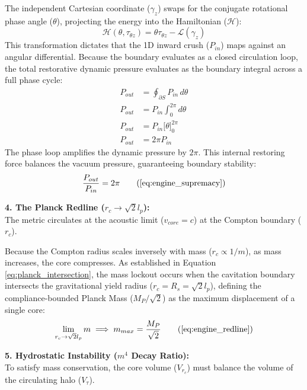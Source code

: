 The independent Cartesian coordinate ($\gamma_z$) swaps for the conjugate rotational phase angle ($\theta$), projecting the energy into the Hamiltonian ($\mathcal{H}$):
\begin{equation}
    \mathcal{H}(\theta, \tau_{\theta z}) = \theta \tau_{\theta z} - \mathcal{L}(\gamma_z) \label{eq:power_legendre}
\end{equation}
This transformation dictates that the 1D inward crush ($P_{in}$) maps against an angular differential. Because the boundary evaluates as a closed circulation loop, the total restorative dynamic pressure evaluates as the boundary integral across a full phase cycle: 
\begin{align}
    P_{out} &= \oint_{\partial S} P_{in} \, d\theta  \nonumber \\
    P_{out} &= P_{in} \int_{0}^{2\pi} d\theta \nonumber \\
    P_{out} &= P_{in} \Big[ \theta \Big]_{0}^{2\pi} \nonumber \\
    P_{out} &= 2\pi P_{in} \nonumber
\end{align}
The phase loop amplifies the dynamic pressure by $2\pi$. This internal restoring force balances the vacuum pressure, guaranteeing boundary stability:
\begin{equation}
    \frac{P_{out}}{P_{in}} = 2\pi \tag{\ref{eq:engine_supremacy}}
\end{equation}

\textbf{4. The Planck Redline ($r_c \to \sqrt{2} l_p$):} \\ %
The metric circulates at the acoustic limit ($v_{core} = c$) at the Compton boundary ($r_c$).

Because the Compton radius scales inversely with mass ($r_c \propto 1/m$), as mass increases, the core compresses. As established in Equation \ref{eq:planck_intersection}, the mass lockout occurs when the cavitation boundary intersects the gravitational yield radius ($r_c = R_s = \sqrt{2} l_p$), defining the compliance-bounded Planck Mass ($M_P / \sqrt{2}$) as the maximum displacement of a single core: %
\begin{equation}
    \lim_{r_c \to \sqrt{2} l_p} m \implies m_{max} = \frac{M_P}{\sqrt{2}} \tag{\ref{eq:engine_redline}} %
\end{equation}

\textbf{5. Hydrostatic Instability ($m^4$ Decay Ratio):} \\
To satisfy mass conservation, the core volume ($V_{r_c}$) must balance the volume of the circulating halo ($V_\tau$). 

